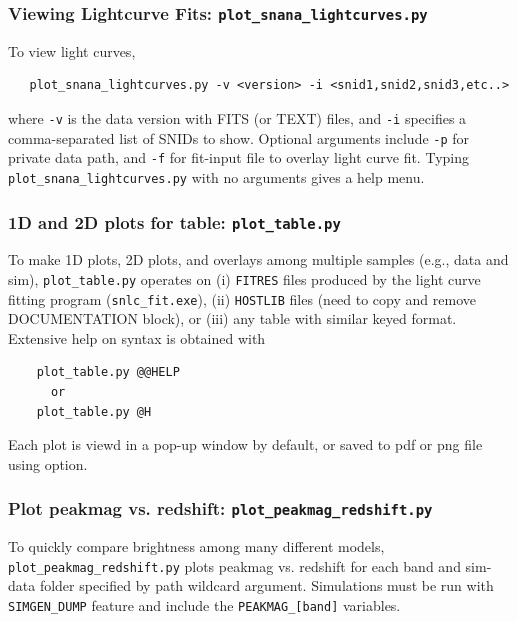 \documentclass[12pt]{article}
\begin{document}
  \subsubsection{Viewing Lightcurve Fits: {\tt plot\_snana\_lightcurves.py} }
   \label{sss:lcplot}

To view light curves,
\begin{verbatim}
   plot_snana_lightcurves.py -v <version> -i <snid1,snid2,snid3,etc..>
\end{verbatim}
where {\tt -v} is the data version with FITS (or TEXT) files,
and {\tt -i} specifies a comma-separated list of SNIDs to show.
Optional arguments include {\tt -p} for private data path,
and {\tt -f} for fit-input file to overlay light curve fit. 
Typing {\tt plot\_snana\_lightcurves.py} with no arguments gives a help menu.

\subsubsection{1D and 2D plots for table: {\tt plot\_table.py} }
\label{sss:plot_table}

To make 1D plots, 2D plots, and overlays among multiple samples (e.g., data and sim),
{\tt plot\_table.py} operates on
(i) {\tt FITRES} files produced by the light curve
fitting program ({\tt snlc\_fit.exe}),
(ii) {\tt HOSTLIB} files
(need to copy and remove DOCUMENTATION block), or
(iii) any table with similar keyed format.
Extensive help on syntax is obtained with
\begin{verbatim}
    plot_table.py @@HELP
      or 
    plot_table.py @H
\end{verbatim}
%
Each plot is viewd in a pop-up window by default, or saved
to pdf or png file using {\tt \@\@SAVE} option.


\subsubsection{Plot peakmag vs. redshift: {\tt plot\_peakmag\_redshift.py} }
\label{sss:plot_peakmag}

To quickly compare brightness among many different models,
{\tt plot\_peakmag\_redshift.py} plots peakmag vs. redshift for each
band and sim-data folder specified by path wildcard argument.
Simulations must be run with {\tt SIMGEN\_DUMP} feature and include the
{\tt PEAKMAG\_[band]} variables.


   \clearpage
\end{document}
